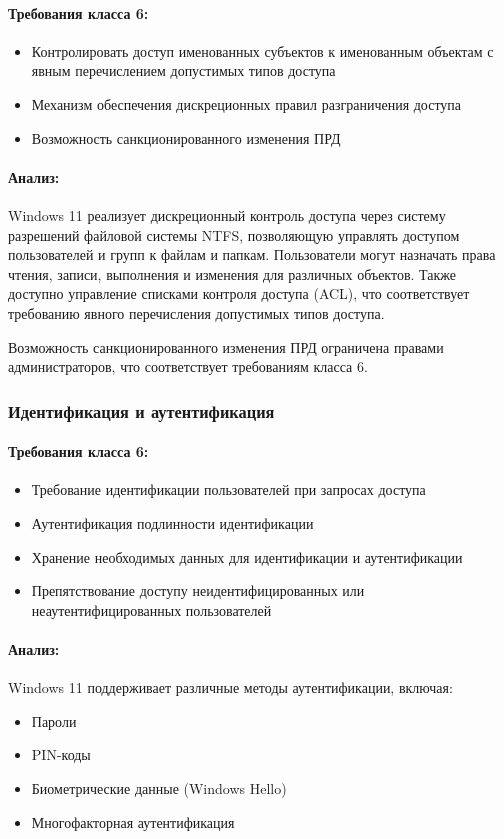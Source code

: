 \documentclass[a4paper, 14pt]{report}
\begin{document}
\paragraph{Требования класса 6:}
\begin{itemize}
    \item Контролировать доступ именованных субъектов к именованным объектам с явным перечислением допустимых типов доступа
    \item Механизм обеспечения дискреционных правил разграничения доступа
    \item Возможность санкционированного изменения ПРД
\end{itemize}

\paragraph{Анализ:}
Windows 11 реализует дискреционный контроль доступа через систему разрешений файловой системы NTFS, позволяющую управлять доступом пользователей и групп к файлам и папкам. Пользователи могут назначать права чтения, записи, выполнения и изменения для различных объектов. Также доступно управление списками контроля доступа (ACL), что соответствует требованию явного перечисления допустимых типов доступа.

Возможность санкционированного изменения ПРД ограничена правами администраторов, что соответствует требованиям класса 6.

\subsubsection{Идентификация и аутентификация}

\paragraph{Требования класса 6:}
\begin{itemize}
    \item Требование идентификации пользователей при запросах доступа
    \item Аутентификация подлинности идентификации
    \item Хранение необходимых данных для идентификации и аутентификации
    \item Препятствование доступу неидентифицированных или неаутентифицированных пользователей
\end{itemize}

\paragraph{Анализ:}
Windows 11 поддерживает различные методы аутентификации, включая:
\begin{itemize}
    \item Пароли
    \item PIN-коды
    \item Биометрические данные (Windows Hello)
    \item Многофакторная аутентификация
\end{itemize}
\end{document}
